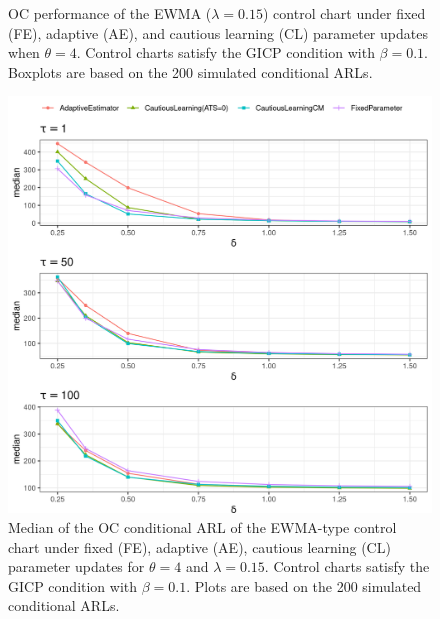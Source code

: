 \begin{figure}
\begin{subfigure}{0.49\textwidth}
\end{subfigure}
  \caption{OC performance of the EWMA ($ \lambda = 0.15$) control chart under fixed (FE), adaptive (AE), and cautious learning (CL) parameter updates when $ \theta = 4$.
    Control charts satisfy the GICP condition  with $ \beta = 0.1$.
  Boxplots are based on the 200 simulated conditional ARLs.}
  \label{fig:lambda=0.15/EWMA OC theta=4}
\end{figure}

\begin{figure}
  \includegraphics[width=\textwidth]{img/sims/theta=4.0_signedEWMA(l = 0.15, upw = true, L = 1.0)/OC-profiles.png}
  \caption{Median of the OC conditional ARL of the EWMA-type control chart under fixed (FE), adaptive (AE), cautious learning (CL) parameter updates for $ \theta = 4$ and $ \lambda = 0.15$.
    Control charts satisfy the GICP condition  with $ \beta = 0.1$.
  Plots are based on the 200 simulated conditional ARLs.}
  \label{fig:lambda=0.05/EWMA OC profiles}
\end{figure}


